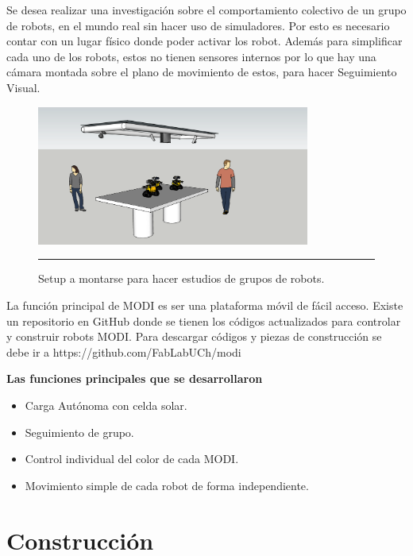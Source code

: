 Se desea realizar una investigación sobre el comportamiento colectivo de un grupo de robots, en el mundo real sin hacer uso de simuladores. Por esto  es necesario contar con un lugar físico donde poder activar los robot. Además para simplificar cada uno de los robots, estos no tienen sensores internos por lo que hay una cámara montada sobre el plano de movimiento de estos, para hacer Seguimiento Visual.
\begin{figure}[htbp]
	\centering
		\includegraphics[width=0.8\textwidth]{./Figures/setup.png}
		\rule{35em}{0.5pt}
	\caption[Setup]{Setup a montarse para hacer estudios de grupos de robots.}
	\label{fig:setup}
\end{figure}

La función principal de MODI es ser una plataforma móvil de fácil acceso. Existe un repositorio en GitHub donde se tienen los códigos actualizados para controlar y construir robots MODI.  Para descargar códigos y piezas de construcción se debe ir a https://github.com/FabLabUCh/modi

\textbf{Las funciones principales que se desarrollaron}

\begin{itemize}
\item Carga Autónoma con celda solar.
\item Seguimiento de grupo.
\item Control individual del color de cada MODI.
\item Movimiento simple de cada robot de forma independiente.
\end{itemize}


\section{Construcción}

